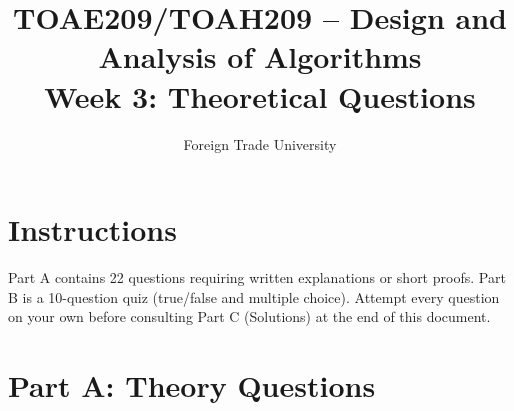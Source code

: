 \documentclass[11pt]{article}
\title{TOAE209/TOAH209 -- Design and Analysis of Algorithms\\[4pt]
\large Week 3: Theoretical Questions}
\author{Foreign Trade University}
\date{}
\begin{document}
\maketitle

\section*{Instructions}

Part A contains 22 questions requiring written explanations or short proofs. Part B is a
10-question quiz (true/false and multiple choice). Attempt every question on your own
before consulting Part C (Solutions) at the end of this document.

\section*{Part A: Theory Questions}
\end{document}
